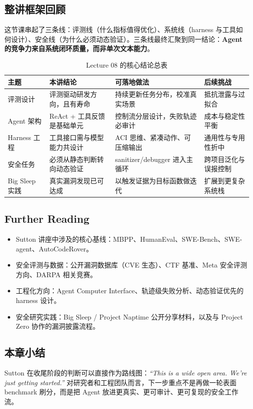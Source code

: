 \documentclass[a4paper]{article}
\begin{document}
\subsection{整讲框架回顾}
这节课串起了三条线：评测线（什么指标值得优化）、系统线（harness 与工具如何设计）、安全线（为什么必须动态验证）。三条线最终汇聚到同一结论：\textbf{Agent 的竞争力来自系统闭环质量，而非单次文本能力}。

\begin{table}[H]
\centering
\begin{tabular}{p{3.1cm}p{4.4cm}p{4.2cm}p{2.6cm}}
\toprule
\textbf{主题} & \textbf{本讲结论} & \textbf{可落地做法} & \textbf{后续挑战} \\
\midrule
评测设计 & 评测驱动研发方向，且有寿命 & 持续更新任务分布，校准真实场景 & 抵抗泄露与过拟合 \\
Agent 架构 & ReAct + 工具反馈是基础单元 & 控制流分层设计，失败轨迹必审计 & 成本与稳定性平衡 \\
Harness 工程 & 工具接口需与模型能力共设计 & ACI 思维、紧凑动作、可压缩输出 & 通用性与专用性折中 \\
安全任务 & 必须从静态判断转向动态验证 & sanitizer/debugger 进入主循环 & 跨项目泛化与误报控制 \\
Big Sleep 实践 & 真实漏洞发现已可达成 & 以触发证据为目标函数做迭代 & 扩展到更复杂系统栈 \\
\bottomrule
\end{tabular}
\caption{Lecture 08 的核心结论总表}
\end{table}

\subsection{Further Reading}
\begin{itemize}
    \item Sutton 讲座中涉及的核心基线：MBPP、HumanEval、SWE-Bench、SWE-agent、AutoCodeRover。
    \item 安全评测与数据：公开漏洞数据库（CVE 生态）、CTF 基准、Meta 安全评测方向、DARPA 相关竞赛。
    \item 工程化方向：Agent Computer Interface、轨迹级失败分析、动态验证优先的 harness 设计。
    \item 安全研究实践：Big Sleep / Project Naptime 公开分享材料，以及与 Project Zero 协作的漏洞披露流程。
\end{itemize}

\subsection{本章小结}
Sutton 在收尾阶段的判断可以直接作为路线图：\textit{``This is a wide open area. We're just getting started.''} 对研究者和工程团队而言，下一步重点不是再做一轮表面 benchmark 刷分，而是把 Agent 放进更真实、更可审计、更可复现的安全工作流。
\end{document}
